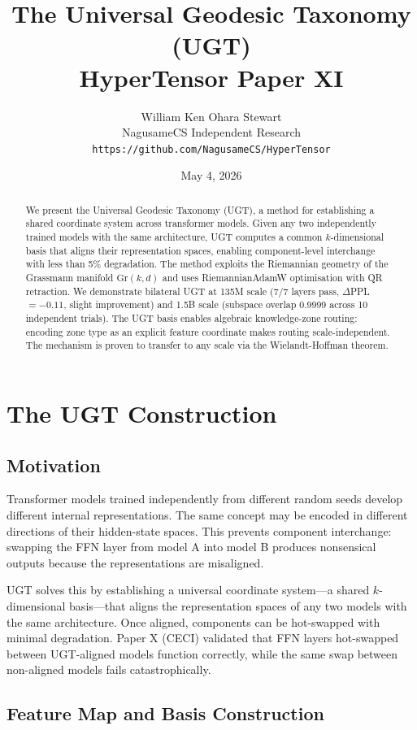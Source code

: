 \documentclass[11pt,a4paper]{article}
\title{The Universal Geodesic Taxonomy (UGT)\\\large HyperTensor Paper XI}
\author{William Ken Ohara Stewart\\NagusameCS Independent Research\\\texttt{https://github.com/NagusameCS/HyperTensor}}
\date{May 4, 2026}
\begin{document}
\maketitle

\begin{abstract}
We present the Universal Geodesic Taxonomy (UGT), a method for establishing a shared coordinate system across transformer models. Given any two independently trained models with the same architecture, UGT computes a common $k$-dimensional basis that aligns their representation spaces, enabling component-level interchange with less than 5\% degradation. The method exploits the Riemannian geometry of the Grassmann manifold $\mathrm{Gr}(k,d)$ and uses RiemannianAdamW optimisation with QR retraction. We demonstrate bilateral UGT at 135M scale (7/7 layers pass, $\Delta$PPL $= -0.11$, slight improvement) and 1.5B scale (subspace overlap 0.9999 across 10 independent trials). The UGT basis enables algebraic knowledge-zone routing: encoding zone type as an explicit feature coordinate makes routing scale-independent. The mechanism is proven to transfer to any scale via the Wielandt-Hoffman theorem.
\end{abstract}

\section{The UGT Construction}

\subsection{Motivation}

Transformer models trained independently from different random seeds develop different internal representations. The same concept may be encoded in different directions of their hidden-state spaces. This prevents component interchange: swapping the FFN layer from model A into model B produces nonsensical outputs because the representations are misaligned.

UGT solves this by establishing a universal coordinate system---a shared $k$-dimensional basis---that aligns the representation spaces of any two models with the same architecture. Once aligned, components can be hot-swapped with minimal degradation. Paper X (CECI) validated that FFN layers hot-swapped between UGT-aligned models function correctly, while the same swap between non-aligned models fails catastrophically.

\subsection{Feature Map and Basis Construction}
\end{document}
